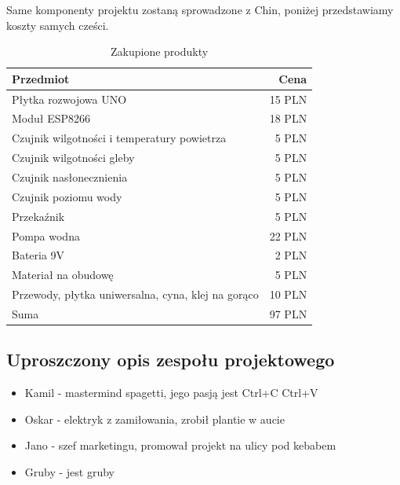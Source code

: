 \documentclass[12pt]{article}
\begin{document}
Same komponenty projektu zostaną sprowadzone z Chin, poniżej przedstawiamy koszty samych cześci.

\begin{table}[!h]
	\centering
	\begin{tabular}{l|r}
		Przedmiot & Cena \\\hline
		
		Płytka rozwojowa UNO & 15 PLN \\
		
		Moduł ESP8266 & 18 PLN \\
		
		Czujnik wilgotności i temperatury powietrza & 5 PLN \\
		
		Czujnik wilgotności gleby & 5 PLN \\
		
		Czujnik nasłonecznienia & 5 PLN \\
		
		Czujnik poziomu wody & 5 PLN \\
		
		Przekaźnik & 5 PLN \\
		
		Pompa wodna & 22 PLN \\
		
		Bateria 9V & 2 PLN \\
		
		Materiał na obudowę & 5 PLN \\
		
		Przewody, płytka uniwersalna, cyna, klej na gorąco & 10 PLN 
		\\ \hline
		Suma & 97 PLN
		
	\end{tabular}
	\caption{\label{tab:widgets}Zakupione produkty}
\end{table}


\subsection{Uproszczony opis zespołu projektowego}

\begin{itemize}
\item Kamil - mastermind spagetti, jego pasją jest Ctrl+C Ctrl+V

\item Oskar - elektryk z zamiłowania, zrobił plantie w aucie

\item Jano - szef marketingu, promował projekt na ulicy pod kebabem

\item Gruby - jest gruby
\end{itemize}
\end{document}
